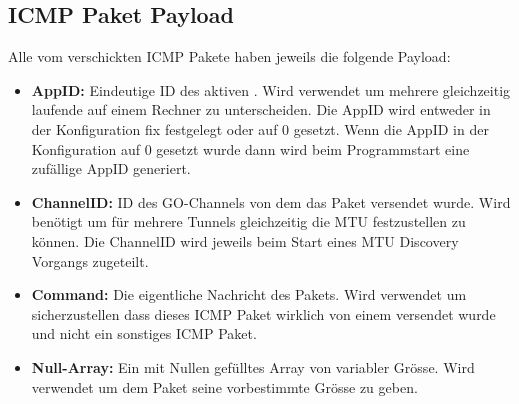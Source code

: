 
\subsection{ICMP Paket Payload}
Alle vom \tool{} verschickten \acs{ICMP} Pakete haben jeweils die folgende Payload:

\begin{itemize}
  \item \textbf{AppID:} Eindeutige ID des aktiven \tool{}. Wird verwendet um mehrere gleichzeitig laufende \tool{} auf einem Rechner zu unterscheiden. Die AppID wird entweder in der Konfiguration fix festgelegt oder auf 0 gesetzt. Wenn die AppID in der Konfiguration auf 0 gesetzt wurde dann wird beim Programmstart eine zufällige AppID generiert.
  \item \textbf{ChannelID:} ID des GO-Channels von dem das Paket versendet wurde. Wird benötigt um für mehrere Tunnels gleichzeitig die \acs{MTU} festzustellen zu können. Die ChannelID wird jeweils beim Start eines \acs{MTU} Discovery Vorgangs zugeteilt.
  \item \textbf{Command:} Die eigentliche Nachricht des Pakets. Wird verwendet um sicherzustellen dass dieses \acs{ICMP} Paket wirklich von einem \tool{} versendet wurde und nicht ein sonstiges \acs{ICMP} Paket.
  \item \textbf{Null-Array:} Ein mit Nullen gefülltes Array von variabler Grösse. Wird verwendet um dem Paket seine vorbestimmte Grösse zu geben.
\end{itemize}

